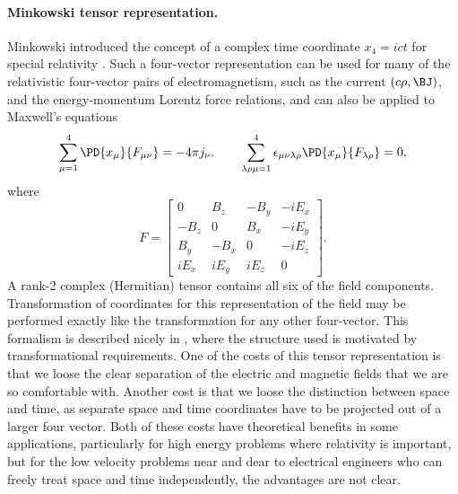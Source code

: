 \paragraph{Minkowski tensor representation.}
Minkowski introduced the concept of a complex time coordinate \( x_4 = i c t \) for special relativity \citep{einstein2015relativityMinkowski}.
Such a four-vector representation can be used for many of the relativistic four-vector pairs of electromagnetism, such as the current \((c\rho, \BJ)\), and the energy-momentum Lorentz force relations, and can also be applied to Maxwell's equations
\begin{equation}\label{eqn:manyfaces:140}
\sum_{\mu= 1}^4 \PD{x_\mu}{F_{\mu\nu}} = - 4 \pi j_\nu.
\qquad
\sum_{\lambda\rho\mu=1}^4
\epsilon_{\mu\nu\lambda\rho}
\PD{x_\mu}{F_{\lambda\rho}} = 0,
\end{equation}
where
\begin{dmath}\label{eqn:manyfaces:160}
F
=
\begin{bmatrix}
0 & B_z & -B_y & -i E_x \\
-B_z & 0 & B_x & -i E_y \\
B_y & -B_x & 0 & -i E_z \\
i E_x & i E_y & i E_z & 0
\end{bmatrix}.
\end{dmath}
A rank-2 complex (Hermitian) tensor contains all six of the field components.
Transformation of coordinates for this representation of the field may be performed exactly
like the transformation for any other four-vector.
This formalism is described nicely in \citep{schwartz1987pe}, where the structure used is motivated by transformational requirements.
One of the costs of this tensor representation is that we loose the clear separation of the electric and magnetic fields that we are so comfortable with.
Another cost is that we loose the
distinction between space and time,
as separate space and time coordinates have to be projected out of a larger four vector.
Both of these costs have theoretical benefits in some applications, particularly for high energy
problems where relativity is important, but for the low velocity problems
near and dear to electrical engineers who can freely treat space and time independently,
the advantages are not clear.


